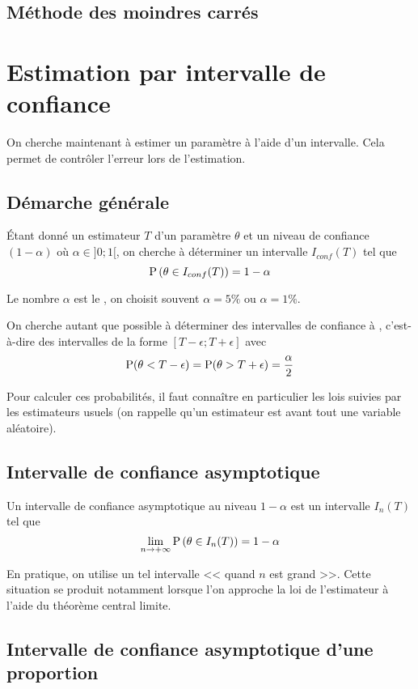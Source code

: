 \subsection{Méthode des moindres carrés}


\section{Estimation par intervalle de confiance}
On cherche maintenant à estimer un paramètre à l'aide d'un intervalle. Cela  permet de contrôler l'erreur lors de l'estimation.

\subsection{Démarche générale}
\'Etant donné un estimateur $T$ d'un paramètre $\theta$ et un niveau de confiance $(1-\alpha)$ où $\alpha \in ]0;1[$, on cherche à déterminer un intervalle $I_{conf}(T)$ tel que 
$$\operatorname{P}\left(\theta \in I_{conf}(T)\right) = 1-\alpha$$

Le nombre $\alpha$ est le , on choisit souvent $\alpha = 5\%$ ou $\alpha = 1\%$.

On cherche autant que possible à déterminer des intervalles de confiance à , c'est-à-dire des intervalles de la forme $[T-\epsilon;T+\epsilon]$ avec 
$$\operatorname{P}(\theta < T-\epsilon) = \operatorname{P}(\theta > T+\epsilon) = \frac{\alpha}{2}$$

Pour calculer ces probabilités, il faut connaître en particulier les lois suivies par les estimateurs usuels (on rappelle qu'un estimateur est avant tout une variable aléatoire).

\subsection{Intervalle de confiance asymptotique}
Un intervalle de confiance asymptotique au niveau $1-\alpha$ est un intervalle $I_{n}(T)$ tel que 
$$\lim_{n \to +\infty} \operatorname{P}\left(\theta \in I_{n}(T)\right) = 1-\alpha$$

En pratique, on utilise un tel intervalle << quand $n$ est grand >>. Cette situation se produit notamment lorsque l'on approche la loi de l'estimateur à l'aide du théorème central limite.

\subsection{Intervalle de confiance asymptotique d'une proportion}
